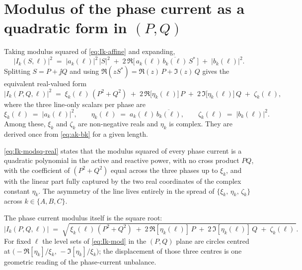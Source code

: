 
\section{\texorpdfstring{Modulus of the phase current as a quadratic form in $(P,Q)$}{Modulus of the phase current as a quadratic form in (P,Q)}}
\label{sec:quadratic}

Taking modulus squared of \autoref{eq:Ik-affine} and expanding,
%
\begin{equation}
\label{eq:Ik-modsq-complex}
\bigl|I_{k}(S,\ell)\bigr|^{2}
\;=\;
\bigl|a_{k}(\ell)\bigr|^{2}\,|S|^{2}
\;+\;
2\,\Re\!\bigl[\,a_{k}(\ell)\,\overline{b_{k}(\ell)}\,S^{*}\,\bigr]
\;+\;
\bigl|b_{k}(\ell)\bigr|^{2}.
\end{equation}
%
Splitting $S = P + \jj Q$ and using
$\Re(zS^{*}) = \Re(z)\,P + \Im(z)\,Q$ gives the equivalent real-valued
form
%
\begin{equation}
\label{eq:Ik-modsq-real}
\bigl|I_{k}(P,Q,\ell)\bigr|^{2}
\;=\;
\xi_{k}(\ell)\,(P^{2}+Q^{2})
\;+\;
2\,\Re\!\bigl[\eta_{k}(\ell)\bigr]\,P
\;+\;
2\,\Im\!\bigl[\eta_{k}(\ell)\bigr]\,Q
\;+\;
\zeta_{k}(\ell),
\end{equation}
%
\noindent where the three line-only scalars per phase are
%
\begin{equation}
\label{eq:xi-eta-zeta}
\xi_{k}(\ell) \;=\; \bigl|a_{k}(\ell)\bigr|^{2},
\qquad
\eta_{k}(\ell) \;=\; a_{k}(\ell)\,\overline{b_{k}(\ell)},
\qquad
\zeta_{k}(\ell) \;=\; \bigl|b_{k}(\ell)\bigr|^{2}.
\end{equation}
%
Among these, $\xi_{k}$ and $\zeta_{k}$ are non-negative reals and
$\eta_{k}$ is complex. They are derived once from \autoref{eq:ak-bk}
for a given length.

\autoref{eq:Ik-modsq-real} states that the modulus squared of every
phase current is a quadratic polynomial in the active and reactive
power, with no cross product $PQ$, with the coefficient of
$(P^{2}+Q^{2})$ equal across the three phases up to $\xi_{k}$, and with
the linear part fully captured by the two real coordinates of the
complex constant $\eta_{k}$. The asymmetry of the line lives entirely
in the spread of $\{\xi_{k},\,\eta_{k},\,\zeta_{k}\}$ across
$k\in\{A,B,C\}$.

The phase current modulus itself is the square root:
%
\begin{equation}
\label{eq:Ik-mod}
\bigl|I_{k}(P,Q,\ell)\bigr|
\;=\;
\sqrt{\,
\xi_{k}(\ell)\,(P^{2}+Q^{2})
\;+\;
2\,\Re[\eta_{k}(\ell)]\,P
\;+\;
2\,\Im[\eta_{k}(\ell)]\,Q
\;+\;
\zeta_{k}(\ell)\,}.
\end{equation}
%
For fixed $\ell$ the level sets of \autoref{eq:Ik-mod} in the $(P,Q)$
plane are circles centred at
$\bigl(-\Re[\eta_{k}]/\xi_{k},\,-\Im[\eta_{k}]/\xi_{k}\bigr)$;
the displacement of those three centres is one geometric reading of the
phase-current unbalance.
